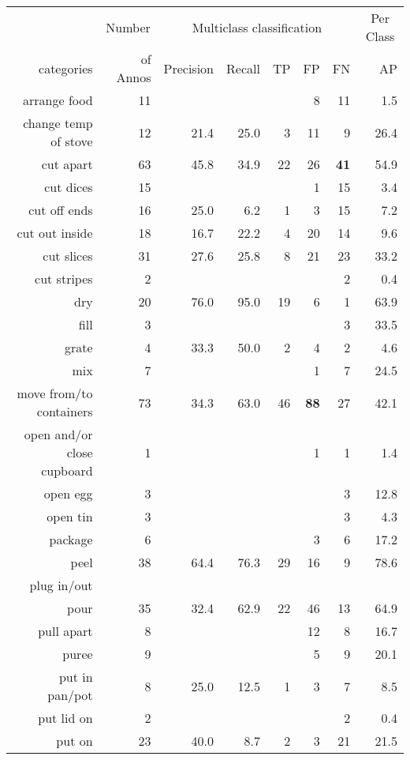 \begin{tabular}{r r r@{\ \ }r@{\ \ }r@{\ \ }r@{\ \ }r r}
\toprule  & \multicolumn{1}{c}{Number}  & \multicolumn{5}{c}{Multiclass classification}  & \multicolumn{1}{c}{Per Class} \\
categories&of Annos&Precision&Recall&TP&FP&FN&AP\\
\cmidrule(lr){1-1} \cmidrule(lr){2-2} \cmidrule(lr){3-7} \cmidrule(lr){8-8}
arrange food & 11 &  &  &  & 8 & 11 & 1.5 \\
change temp of stove & 12 & 21.4 & 25.0 & 3 & 11 & 9 & 26.4 \\
cut apart & 63 & 45.8 & 34.9 & 22 & 26 & \textbf{41} & 54.9 \\
cut dices & 15 &  &  &  & 1 & 15 & 3.4 \\
cut off ends & 16 & 25.0 & 6.2 & 1 & 3 & 15 & 7.2 \\
cut out inside & 18 & 16.7 & 22.2 & 4 & 20 & 14 & 9.6 \\
cut slices & 31 & 27.6 & 25.8 & 8 & 21 & 23 & 33.2 \\
cut stripes & 2 &  &  &  &  & 2 & 0.4 \\
dry & 20 & 76.0 & 95.0 & 19 & 6 & 1 & 63.9 \\
fill & 3 &  &  &  &  & 3 & 33.5 \\
grate & 4 & 33.3 & 50.0 & 2 & 4 & 2 & 4.6 \\
mix & 7 &  &  &  & 1 & 7 & 24.5 \\
move from/to containers & 73 & 34.3 & 63.0 & 46 & \textbf{88} & 27 & 42.1 \\
open and/or close cupboard & 1 &  &  &  & 1 & 1 & 1.4 \\
open egg & 3 &  &  &  &  & 3 & 12.8 \\
open tin & 3 &  &  &  &  & 3 & 4.3 \\
package & 6 &  &  &  & 3 & 6 & 17.2 \\
peel & 38 & 64.4 & 76.3 & 29 & 16 & 9 & 78.6 \\
plug in/out &  &  &  &  &  &  &  \\
pour & 35 & 32.4 & 62.9 & 22 & 46 & 13 & 64.9 \\
pull apart & 8 &  &  &  & 12 & 8 & 16.7 \\
puree & 9 &  &  &  & 5 & 9 & 20.1 \\
put in pan/pot & 8 & 25.0 & 12.5 & 1 & 3 & 7 & 8.5 \\
put lid on & 2 &  &  &  &  & 2 & 0.4 \\
put on & 23 & 40.0 & 8.7 & 2 & 3 & 21 & 21.5 \\

\end{tabular}

